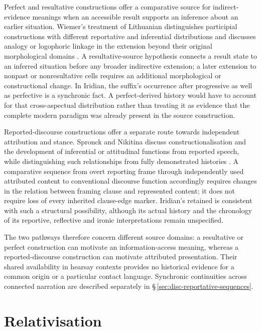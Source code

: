 Perfect and resultative constructions offer a comparative source for
indirect-evidence meanings when an accessible result supports an inference
about an earlier situation. Wiemer's treatment of Lithuanian
distinguishes participial constructions with different reportative and
inferential distributions and discusses analogy or logophoric linkage in
the extension beyond their original morphological domains
\cite[§2, pp.~37--41]{wiemer2006}. A resultative-source hypothesis connects a
result state to an inferred situation before any broader indirective
extension; a later extension to nonpast or nonresultative cells requires
an additional morphological or constructional change. In Iridian, the
suffix's occurrence after progressive  as well as perfective
 is a synchronic fact. A perfect-derived history would have to
account for that cross-aspectual distribution rather than treating it as
evidence that the complete modern paradigm was already present in the
source construction.

Reported-discourse constructions offer a separate route towards
independent attribution and stance. Spronck and Nikitina discuss
constructionalisation and the development of inferential or attitudinal
functions from reported speech, while distinguishing such relationships
from fully demonstrated histories
\cite[§2.7, pp.~140--142; §3.2, pp.~151--152]{sproncknikitina2019}.
A comparative sequence from overt reporting frame through independently
used attributed content to conventional discourse function accordingly
requires changes in the relation between framing clause and represented
content; it does not require loss of every inherited clause-edge marker.
Iridian's retained  is consistent with such a structural
possibility, although its actual history and the chronology of its
reportive, reflective and ironic interpretations remain unspecified.

The two pathways therefore concern different source domains: a
resultative or perfect construction can motivate an information-access
meaning, whereas a reported-discourse construction can motivate attributed
presentation. Their shared availability in hearsay contexts provides no
historical evidence for a common origin or a particular contact language.
Synchronic continuities across connected narration are described separately
in §\,\ref{sec:disc-reportative-sequences}.

\section{Relativisation}
\label{sec:th-relativization}

